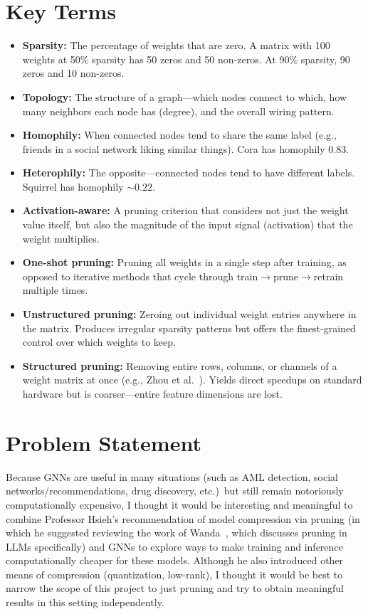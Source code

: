 \documentclass[10pt]{article}
\author{Michael Mansour --- CS260C Project Proposal (S26) --- Compression by Pruning in GNNs}
\date{}
\begin{document}
\maketitle

\section{Key Terms}
\begin{itemize}[leftmargin=*,itemsep=1pt,parsep=0pt]
\item \textbf{Sparsity:} The percentage of weights that are zero. A matrix with 100 weights at 50\% sparsity has 50 zeros and 50 non-zeros. At 90\% sparsity, 90 zeros and 10 non-zeros.
\item \textbf{Topology:} The structure of a graph---which nodes connect to which, how many neighbors each node has (degree), and the overall wiring pattern.
\item \textbf{Homophily:} When connected nodes tend to share the same label (e.g., friends in a social network liking similar things). Cora has homophily 0.83.
\item \textbf{Heterophily:} The opposite---connected nodes tend to have different labels. Squirrel has homophily ${\sim}0.22$.
\item \textbf{Activation-aware:} A pruning criterion that considers not just the weight value itself, but also the magnitude of the input signal (activation) that the weight multiplies.
\item \textbf{One-shot pruning:} Pruning all weights in a single step after training, as opposed to iterative methods that cycle through train$\to$prune$\to$retrain multiple times.
\item \textbf{Unstructured pruning:} Zeroing out individual weight entries anywhere in the matrix. Produces irregular sparsity patterns but offers the finest-grained control over which weights to keep.
\item \textbf{Structured pruning:} Removing entire rows, columns, or channels of a weight matrix at once (e.g., Zhou et al.~\cite{zhou2021}). Yields direct speedups on standard hardware but is coarser---entire feature dimensions are lost.
\end{itemize}

\section{Problem Statement}

Because GNNs are useful in many situations (such as AML detection, social networks/recommendations, drug discovery, etc.)\ but still remain notoriously computationally expensive, I thought it would be interesting and meaningful to combine Professor Hsieh's recommendation of model compression via pruning (in which he suggested reviewing the work of Wanda~\cite{sun2024}, which discusses pruning in LLMs specifically) and GNNs to explore ways to make training and inference computationally cheaper for these models. Although he also introduced other means of compression (quantization, low-rank), I thought it would be best to narrow the scope of this project to just pruning and try to obtain meaningful results in this setting independently.
\end{document}
